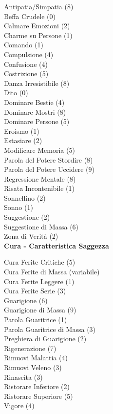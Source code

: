 \begin{multicols}{3}
{	
	Antipatia/Simpatia (8)\\
	Beffa Crudele (0)\\
	Calmare Emozioni (2)\\
	Charme su Persone (1)\\
	Comando (1)\\
	Compulsione (4)\\
	Confusione (4)\\
	Costrizione (5)\\
	Danza Irresistibile (8)\\
	Dito (0)\\
	Dominare Bestie (4)\\
	Dominare Mostri (8)\\
	Dominare Persone (5)\\
	Eroismo (1)\\
	Estasiare (2)\\
	Modificare Memoria (5)\\
	Parola del Potere Stordire (8)\\
	Parola del Potere Uccidere (9)\\
	Regressione Mentale (8)\\
	Risata Incontenibile (1)\\
	Sonnellino (2)\\
	Sonno (1)\\
	Suggestione (2)\\
	Suggestione di Massa (6)\\
	Zona di Verità (2)\\

	\medskip\textbf{Cura - Caratteristica Saggezza}

	Cura Ferite Critiche (5)\\
	Cura Ferite di Massa (variabile)\\
	Cura Ferite Leggere (1)\\
	Cura Ferite Serie (3)\\
	Guarigione (6)\\
	Guarigione di Massa (9)\\
	Parola Guaritrice (1)\\
	Parola Guaritrice di Massa (3)\\
	Preghiera di Guarigione (2)\\
	Rigenerazione (7)\\
	Rimuovi Malattia (4)\\
	Rimuovi Veleno (3)\\
	Rinascita (3)\\
	Ristorare Inferiore (2)\\
	Ristorare Superiore (5)\\
	Vigore (4)\\

}
\end{multicols}
